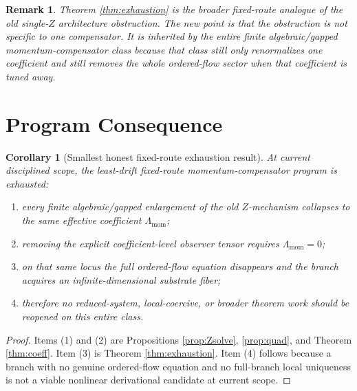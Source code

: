 \documentclass[11pt]{article}
\newtheorem{remark}{Remark}
\newtheorem{corollary}{Corollary}
\begin{document}
\begin{remark}
Theorem \ref{thm:exhaustion} is the broader fixed-route analogue of the old single-\(Z\) architecture obstruction. The new point is that the obstruction is not specific to one compensator. It is inherited by the entire finite algebraic/gapped momentum-compensator class because that class still only renormalizes one coefficient and still removes the whole ordered-flow sector when that coefficient is tuned away.
\end{remark}

\section{Program Consequence}

\begin{corollary}[Smallest honest fixed-route exhaustion result]
\label{cor:program}
At current disciplined scope, the least-drift fixed-route momentum-compensator program is exhausted:
\begin{enumerate}
    \item every finite algebraic/gapped enlargement of the old \(Z\)-mechanism collapses to the same effective coefficient \(\Lambda_{\mathrm{mom}}\);
    \item removing the explicit coefficient-level observer tensor requires \(\Lambda_{\mathrm{mom}}=0\);
    \item on that same locus the full ordered-flow equation disappears and the branch acquires an infinite-dimensional substrate fiber;
    \item therefore no reduced-system, local-coercive, or broader theorem work should be reopened on this entire class.
\end{enumerate}
\end{corollary}

\begin{proof}
Items (1) and (2) are Propositions \ref{prop:Zsolve}, \ref{prop:quad}, and Theorem \ref{thm:coeff}. Item (3) is Theorem \ref{thm:exhaustion}. Item (4) follows because a branch with no genuine ordered-flow equation and no full-branch local uniqueness is not a viable nonlinear derivational candidate at current scope.
\end{proof}
\end{document}
